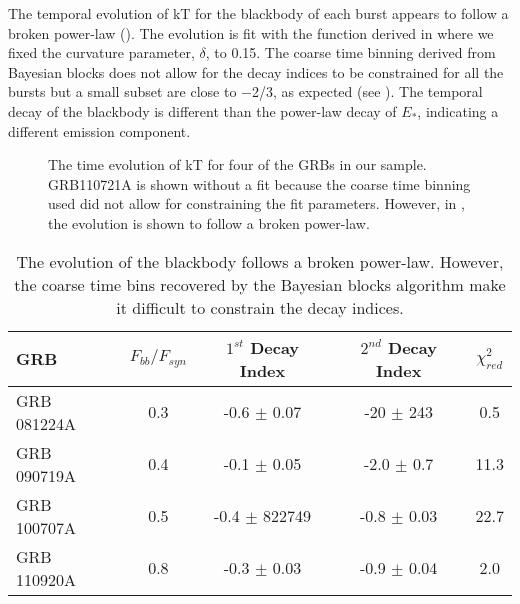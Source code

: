 The temporal evolution of kT for the blackbody of each burst appears
to follow a broken power-law (). The evolution
is fit with the function derived in \cite{Ryde:2004} where we fixed
the curvature parameter, $\delta$, to 0.15. The coarse time binning
derived from Bayesian blocks does not allow for the decay indices to
be constrained for all the bursts but a small subset are close to
$-$2/3, as expected (see ). The temporal decay
of the blackbody is different than the power-law decay of $E_*$,
indicating a different emission component.
\begin{figure}[h!]

  \centering


\caption{The time evolution of kT for four of the GRBs in our
  sample. GRB110721A is shown without a fit because the coarse time
  binning used did not allow for constraining the fit
  parameters. However, in \cite{Axelsson:2012}, the evolution is
  shown to follow a broken power-law.}

   \label{fig:kTEvo}

 \end{figure}


\begin{table}[h!]
\centering
\begin{tabular}{l| c c c c}
GRB & $F_{bb}/F_{syn}$ & $1^{st}$ Decay Index & $2^{nd}$ Decay Index & $\chi^2_{red}$ \\
\hline \hline 

GRB 081224A & 0.3 & -0.6 $\pm$ 0.07 & -20 $\pm$ 243 & 0.5 \\ 

GRB 090719A & 0.4 & -0.1 $\pm$ 0.05 & -2.0 $\pm$ 0.7 & 11.3 \\ 

GRB 100707A & 0.5 & -0.4 $\pm$ 822749 & -0.8 $\pm$ 0.03 & 22.7 \\ 


GRB 110920A & 0.8 & -0.3 $\pm$ 0.03 & -0.9 $\pm$ 0.04 & 2.0\\ 


\end{tabular}
\caption{The evolution of the blackbody follows a broken power-law. However, the coarse time bins recovered by the Bayesian blocks algorithm make it difficult to constrain the decay indices.}
\label{tab:bbEvo}
\end{table}


